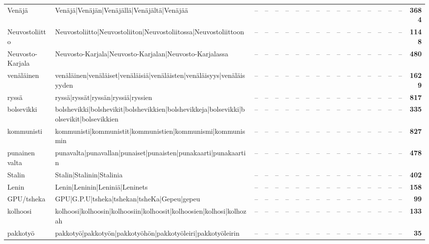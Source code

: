 \documentclass[10pt,a4paper]{article}
\begin{document}
\begin{center}
\begin{longtable}{@{}lp{52mm}rrrrrrrrrrrrrrrr@{}}
Venäjä & {\ttfamily Venäjä|Venäjän|Venäjällä|Venäjältä|Venäjää} & -- & -- & -- & -- & -- & -- & -- & -- & -- & -- & -- & -- & -- & -- & -- & \textbf{3684} \\
Neuvostoliitto & {\ttfamily Neuvostoliitto|Neuvostoliiton|Neuvostoliitossa|Neuvostoliittoon} & -- & -- & -- & -- & -- & -- & -- & -- & -- & -- & -- & -- & -- & -- & -- & \textbf{1148} \\
Neuvosto-Karjala & {\ttfamily Neuvosto-Karjala|Neuvosto-Karjalan|Neuvosto-Karjalassa} & -- & -- & -- & -- & -- & -- & -- & -- & -- & -- & -- & -- & -- & -- & -- & \textbf{480} \\
venäläinen & {\ttfamily venäläinen|venäläiset|venäläisiä|venäläisten|venäläisyys|venäläisyyden} & -- & -- & -- & -- & -- & -- & -- & -- & -- & -- & -- & -- & -- & -- & -- & \textbf{1629} \\
ryssä & {\ttfamily ryssä|ryssät|ryssän|ryssiä|ryssien} & -- & -- & -- & -- & -- & -- & -- & -- & -- & -- & -- & -- & -- & -- & -- & \textbf{817} \\
bolsevikki & {\ttfamily bolshevikki|bolshevikit|bolshevikkien|bolshevikkeja|bolsevikki|bolsevikit|bolsevikkien} & -- & -- & -- & -- & -- & -- & -- & -- & -- & -- & -- & -- & -- & -- & -- & \textbf{335} \\
kommunisti & {\ttfamily kommunisti|kommunistit|kommunistien|kommunismi|kommunismin} & -- & -- & -- & -- & -- & -- & -- & -- & -- & -- & -- & -- & -- & -- & -- & \textbf{827} \\
punainen valta & {\ttfamily punavalta|punavallan|punaiset|punaisten|punakaarti|punakaartin} & -- & -- & -- & -- & -- & -- & -- & -- & -- & -- & -- & -- & -- & -- & -- & \textbf{478} \\
Stalin & {\ttfamily Stalin|Stalinin|Stalinia} & -- & -- & -- & -- & -- & -- & -- & -- & -- & -- & -- & -- & -- & -- & -- & \textbf{402} \\
Lenin & {\ttfamily Lenin|Leninin|Leniniä|Leninets} & -- & -- & -- & -- & -- & -- & -- & -- & -- & -- & -- & -- & -- & -- & -- & \textbf{158} \\
GPU/tsheka & {\ttfamily GPU|G.P.U|tsheka|tshekan|tsheKa|Gepeu|gepeu} & -- & -- & -- & -- & -- & -- & -- & -- & -- & -- & -- & -- & -- & -- & -- & \textbf{99} \\
kolhoosi & {\ttfamily kolhoosi|kolhoosin|kolhoosiin|kolhoosit|kolhoosien|kolhosi|kolhozah} & -- & -- & -- & -- & -- & -- & -- & -- & -- & -- & -- & -- & -- & -- & -- & \textbf{133} \\
pakkotyö & {\ttfamily pakkotyö|pakkotyön|pakkotyöhön|pakkotyöleiri|pakkotyöleirin} & -- & -- & -- & -- & -- & -- & -- & -- & -- & -- & -- & -- & -- & -- & -- & \textbf{35} \\

\end{longtable}
\end{center}
\end{document}
